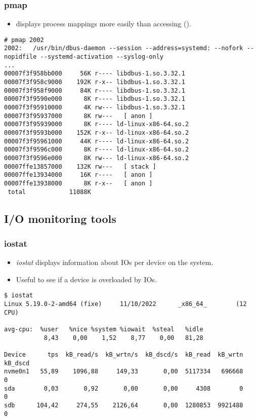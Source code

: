 \begin{frame}[fragile]
  \frametitle{pmap}
  \begin{itemize}
    \item {} displays process mappings more easily than
          accessing  ().
  \end{itemize}
  \begin{block}{}
    \begin{verbatim}
# pmap 2002
2002:   /usr/bin/dbus-daemon --session --address=systemd: --nofork --nopidfile --systemd-activation --syslog-only
...
00007f3f958bb000     56K r---- libdbus-1.so.3.32.1
00007f3f958c9000    192K r-x-- libdbus-1.so.3.32.1
00007f3f958f9000     84K r---- libdbus-1.so.3.32.1
00007f3f9590e000      8K r---- libdbus-1.so.3.32.1
00007f3f95910000      4K rw--- libdbus-1.so.3.32.1
00007f3f95937000      8K rw---   [ anon ]
00007f3f95939000      8K r---- ld-linux-x86-64.so.2
00007f3f9593b000    152K r-x-- ld-linux-x86-64.so.2
00007f3f95961000     44K r---- ld-linux-x86-64.so.2
00007f3f9596c000      8K r---- ld-linux-x86-64.so.2
00007f3f9596e000      8K rw--- ld-linux-x86-64.so.2
00007ffe13857000    132K rw---   [ stack ]
00007ffe13934000     16K r----   [ anon ]
00007ffe13938000      8K r-x--   [ anon ]
 total            11088K
    \end{verbatim}
  \end{block}
\end{frame}

\subsection{I/O monitoring tools}

\begin{frame}[fragile]
  \frametitle{iostat}
  \begin{itemize}
    \item {\em iostat} displays information about IOs per device on the system.
    \item Useful to see if a device is overloaded by IOs.
  \end{itemize}
  \begin{block}{}
    \begin{verbatim}
$ iostat 
Linux 5.19.0-2-amd64 (fixe)     11/10/2022      _x86_64_        (12 CPU)

avg-cpu:  %user   %nice %system %iowait  %steal   %idle
           8,43    0,00    1,52    8,77    0,00   81,28

Device      tps  kB_read/s  kB_wrtn/s  kB_dscd/s  kB_read  kB_wrtn  kB_dscd
nvme0n1   55,89    1096,88     149,33       0,00  5117334   696668        0
sda        0,03       0,92       0,00       0,00     4308        0        0
sdb      104,42     274,55    2126,64       0,00  1280853  9921488        0
    \end{verbatim}
  \end{block}
\end{frame}

